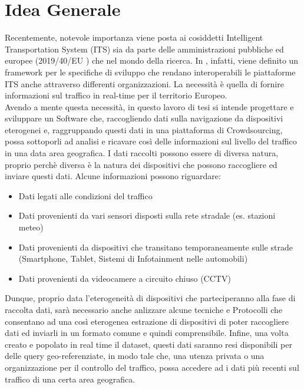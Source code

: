 \section{Idea Generale}
\label{sec:general_idea}
Recentemente, notevole importanza viene posta ai cosiddetti Intelligent Transportation System (ITS) sia da parte delle amministrazioni pubbliche ed europee (2019/40/EU \cite{famous:paper_europe}) che nel mondo della ricerca. \cite{famous:paper_bonvoyage}
In \cite{famous:paper_europe}, infatti, viene definito un framework per le specifiche di sviluppo che rendano interoperabili le piattaforme ITS anche attraverso differenti organizzazioni. La necessità è quella di fornire informazioni sul traffico in real-time per il territorio Europeo.\\
Avendo a mente questa necessità, in questo lavoro di tesi si intende progettare e sviluppare un Software che, raccogliendo dati sulla navigazione da dispositivi eterogenei e, raggruppando questi dati in una piattaforma di Crowdsourcing, possa sottoporli ad analisi e ricavare così delle informazioni sul livello del traffico in una data area geografica.
I dati raccolti possono essere di diversa natura, proprio perchè diversa è la natura dei dispositivi che possono raccogliere ed inviare questi dati. Alcune informazioni possono riguardare:
\begin{itemize}
	\item Dati legati alle condizioni del traffico
	\item Dati provenienti da vari sensori disposti sulla rete stradale (es. stazioni meteo)
	\item Dati provenienti da dispositivi che transitano temporaneamente sulle strade (Smartphone, Tablet, Sistemi di Infotainment nelle automobili)
	\item Dati provenienti da videocamere a circuito chiuso (CCTV)
\end{itemize} 
Dunque, proprio data l'eterogeneità di dispositivi che parteciperanno alla fase di raccolta dati, sarà necessario anche anlizzare alcune tecniche e Protocolli che consentano ad una così eterogenea estrazione di dispositivi di poter raccogliere dati ed inviarli in un formato comune e quindi comprensibile.
Infine, una volta creato e popolato in real time il dataset, questi dati saranno resi disponibili per delle query geo-referenziate, in modo tale che, una utenza privata o una organizzazione per il controllo del traffico, possa accedere ad i dati più recenti sul traffico di una certa area geografica.\\
